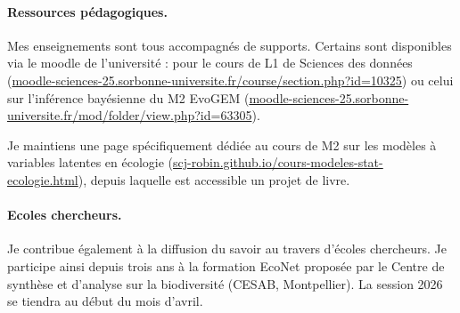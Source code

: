 \paragraph{Ressources pédagogiques.}
Mes enseignements sont tous accompagnés de supports. Certains sont disponibles via le moodle de l’université : pour le cours de L1 de Sciences des données (\url{moodle-sciences-25.sorbonne-universite.fr/course/section.php?id=10325}) ou celui sur l’inférence bayésienne du M2 EvoGEM (\url{moodle-sciences-25.sorbonne-universite.fr/mod/folder/view.php?id=63305}). 

Je maintiens une page spécifiquement dédiée au cours de M2 sur les modèles à variables latentes en écologie (\url{scj-robin.github.io/cours-modeles-stat-ecologie.html}), depuis laquelle est accessible un projet de livre.


\paragraph{Ecoles chercheurs.}
Je contribue également à la diffusion du savoir au travers d’écoles chercheurs. Je participe ainsi depuis trois ans à la formation EcoNet proposée par le Centre de synthèse et d’analyse sur la biodiversité (CESAB, Montpellier). 
La session 2026 se tiendra au début du mois d'avril.


